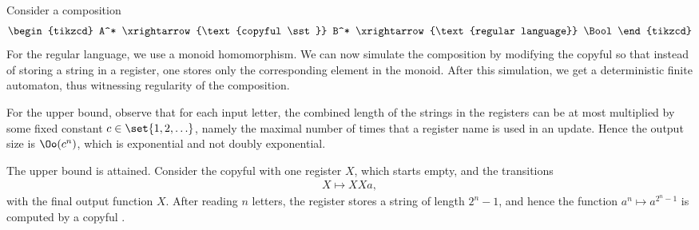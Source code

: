 
 { 
Consider a composition 
\[
\begin{tikzcd}
A^* \xrightarrow {\text{copyful \sst}} B^* \xrightarrow{\text{regular language}} \Bool
\end{tikzcd}
\]
For the regular language, we use a monoid homomorphism. We can now simulate the composition by modifying the  copyful \sst so that instead of storing a string in a register, one stores only  the corresponding element in the monoid. After this simulation, we get a deterministic finite automaton, thus witnessing regularity of the composition.
 }


   {
For the upper bound, observe that for each input letter, the combined length of the strings in the registers can be at most multiplied by some fixed constant $c \in \set{1,2,\ldots}$, namely the maximal number of times that a register name is used in an update. Hence the output size is $\Oo(c^n)$, which is exponential and not doubly exponential.

The upper bound is attained. Consider the copyful \sst with one register $X$, which starts empty, and the transitions
\begin{align*}
X \mapsto XXa,
\end{align*}
with the final output function $X$. After reading $n$ letters, the register stores a string of length $2^n - 1$, and hence the function $a^n \mapsto a^{2^n-1}$ is computed by a copyful \sst.
}

